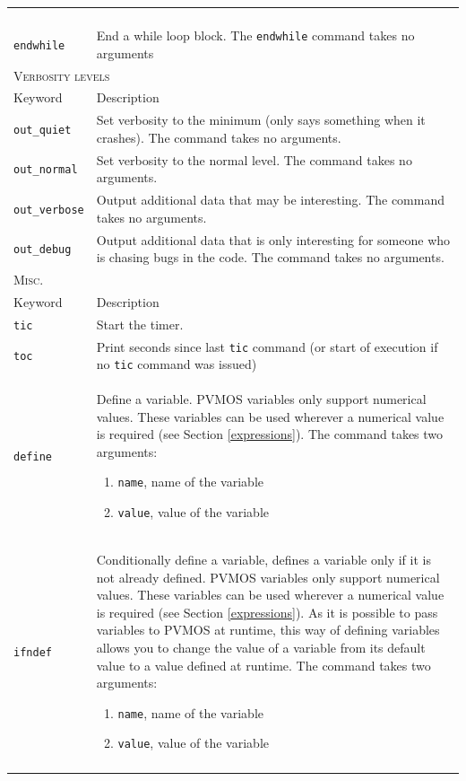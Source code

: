 \documentclass[noshowpacs,preprintnumbers,amsmath,amssymb, letter]{revtex4}
\begin{document}
\begin{longtable}{p{}p{}}
\begin{enumerate}
\end{enumerate}\\
\texttt{endwhile}	&  End a while loop block. The \texttt{endwhile} command takes no arguments\\
\multicolumn{2}{l}{\textsc{Verbosity levels}} \\*
\hline
Keyword & Description \\
\texttt{out\_quiet}	&  Set verbosity to the minimum (only says something when it crashes). The command takes no arguments.\\
\texttt{out\_normal}	&  Set verbosity to the normal level. The command takes no arguments.\\
\texttt{out\_verbose}	&  Output additional data that may be interesting. The command takes no arguments.\\
\texttt{out\_debug}	&  Output additional data that is only interesting for someone who is chasing bugs in the code. The command takes no arguments.\\
\multicolumn{2}{l}{\textsc{Misc.}} \\*
\hline
Keyword & Description \\
\texttt{tic}	&  Start the timer.\\
\texttt{toc}	&  Print seconds since last \texttt{tic} command (or start of execution if no \texttt{tic} command was issued)\\
\texttt{define}	&  Define a variable. PVMOS variables only support numerical values. These variables can be used wherever a numerical value is required (see Section \ref{expressions}). The command takes two arguments:
\begin{enumerate}
\item \texttt{name}, name of the variable
\item \texttt{value}, value of the variable
\end{enumerate}\\
\texttt{ifndef}	&  Conditionally define a variable, defines a variable only if it is not already defined. PVMOS variables only support numerical values. These variables can be used wherever a numerical value is required (see Section \ref{expressions}). As it is possible to pass variables to PVMOS at runtime, this way of defining variables allows you to change the value of a variable from its default value to a value defined at runtime. The command takes two arguments:
\begin{enumerate}
\item \texttt{name}, name of the variable
\item \texttt{value}, value of the variable
\end{enumerate}\\
\hline
\\
\end{longtable}
\end{document}
